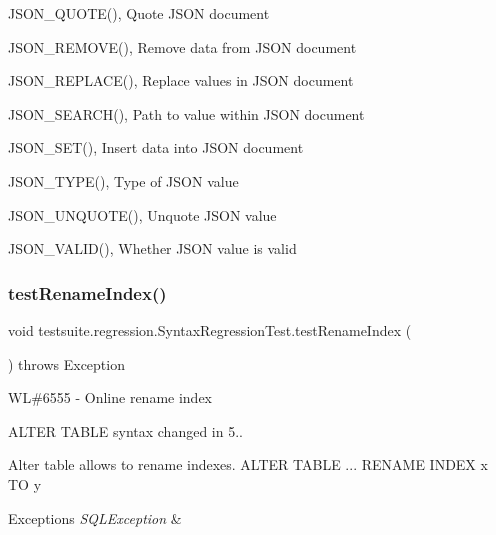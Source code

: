 \begin{DoxyItemize}
\item J\+S\+O\+N\+\_\+\+Q\+U\+O\+T\+E(), Quote J\+S\+ON document
\item J\+S\+O\+N\+\_\+\+R\+E\+M\+O\+V\+E(), Remove data from J\+S\+ON document
\item J\+S\+O\+N\+\_\+\+R\+E\+P\+L\+A\+C\+E(), Replace values in J\+S\+ON document
\item J\+S\+O\+N\+\_\+\+S\+E\+A\+R\+C\+H(), Path to value within J\+S\+ON document
\item J\+S\+O\+N\+\_\+\+S\+E\+T(), Insert data into J\+S\+ON document
\item J\+S\+O\+N\+\_\+\+T\+Y\+P\+E(), Type of J\+S\+ON value
\item J\+S\+O\+N\+\_\+\+U\+N\+Q\+U\+O\+T\+E(), Unquote J\+S\+ON value
\item J\+S\+O\+N\+\_\+\+V\+A\+L\+I\+D(), Whether J\+S\+ON value is valid 
\end{DoxyItemize}\mbox{\label{classtestsuite_1_1regression_1_1_syntax_regression_test_ab5d200050de3d77c76405bdda78d95a6}} 
\subsubsection{\texorpdfstring{test\+Rename\+Index()}{testRenameIndex()}}
{\footnotesize\ttfamily void testsuite.\+regression.\+Syntax\+Regression\+Test.\+test\+Rename\+Index (\begin{DoxyParamCaption}{ }\end{DoxyParamCaption}) throws Exception}

WL\#6555 -\/ Online rename index

A\+L\+T\+ER T\+A\+B\+LE syntax changed in 5..

Alter table allows to rename indexes. A\+L\+T\+ER T\+A\+B\+LE ... R\+E\+N\+A\+ME I\+N\+D\+EX x TO y


\begin{DoxyExceptions}{Exceptions}
{\em S\+Q\+L\+Exception} & \\
\hline
\end{DoxyExceptions}
\mbox{\label{classtestsuite_1_1regression_1_1_syntax_regression_test_a2a908e2479002b77f56fe61e6f25b244}} 

